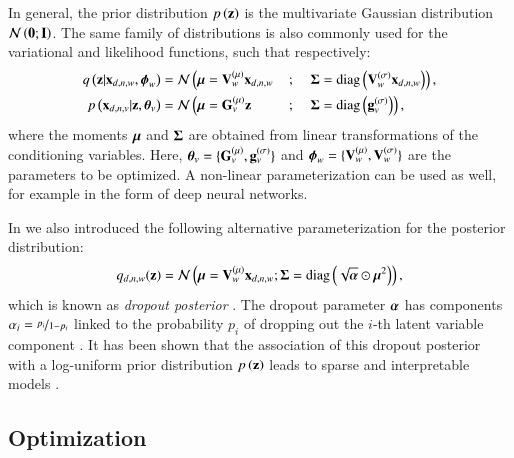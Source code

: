 In general, the prior distribution $p\left(\mathbf{z}\right)$ is the  multivariate Gaussian distribution $\mathcal{N}\left(\mathbf{0};\mathbf{I}\right)$.
The same family of distributions is also commonly used for the variational and likelihood functions, such that respectively:
\begin{alignat}{4}
\label{eq:encoder}
q\left(\mathbf{z}|\mathbf{x}_{d,n,w}, \boldsymbol{\phi}_w\right)  &= \mathcal{N} \left( \boldsymbol{\mu} = \mathbf{V}_w^{(\mu)} \mathbf{x}_{d,n,w} \right. &&{}; &&\left.\boldsymbol{\Sigma} = \operatorname{diag}\left(\mathbf{V}_w^{(\sigma)} \mathbf{x}_{d,n,w}\right) \right), \\
\label{eq:decoder}
p\left(\mathbf{x}_{d,n,v}|\mathbf{z},\boldsymbol{\theta}_v\right) &= \mathcal{N} \left( \boldsymbol{\mu} = \mathbf{G}_v^{(\mu)} \mathbf{z} \right. &&{} ; &&\left.\boldsymbol{\Sigma} = \operatorname{diag}\left(\mathbf{g}_v^{(\sigma)}\right) \right),
\end{alignat}
where the moments $\boldsymbol{\mu}$ and $\boldsymbol{\Sigma}$ are obtained from linear transformations of the conditioning variables.
Here, $\boldsymbol{\theta}_v = \{\mathbf{G}_v^{(\mu)}, \mathbf{g}_v^{(\sigma)}\}$ and $\boldsymbol{\phi}_w=\{\mathbf{V}_w^{(\mu)}, \mathbf{V}_w^{(\sigma)}\}$ are the parameters to be optimized.
A non-linear parameterization can be used as well, for example in the form of deep neural networks.

In \cite{Antelmi2019} we also introduced the following alternative parameterization for the posterior distribution:
\begin{equation}
\label{eq:dropout_posterior}
    q_{d,n,w}(\mathbf{z}) = \mathcal{N}\left(\boldsymbol{\mu} = \mathbf{V}_w^{(\mu)} \mathbf{x}_{d,n,w};\boldsymbol{\Sigma} = \operatorname{diag}\left(\sqrt{\boldsymbol{\alpha}} \odot \boldsymbol{\mu}^2\right)\right),
\end{equation}
which is known as \textit{dropout posterior} \citep{Kingma2015}.
The dropout parameter $\boldsymbol{\alpha}$ has components $\alpha_i = \nicefrac{p_i}{1-p_i}$ linked to the probability $p_i$ of dropping out the $i$-th latent variable component \citep{Wang2013}.
It has been shown that the association of this dropout posterior with a log-uniform prior distribution $p\left(\mathbf{z}\right)$ leads to sparse and interpretable models \citep{Antelmi2019,Molchanov2017}.

\subsection{Optimization}
\label{ssec:optimization}

